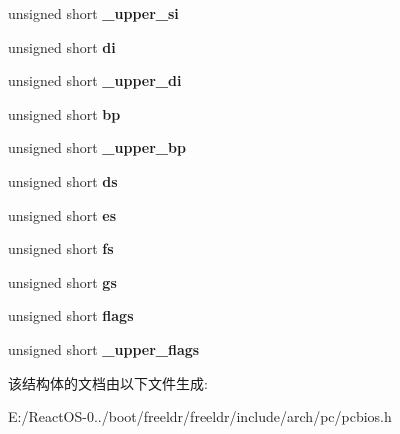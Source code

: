 \begin{DoxyCompactItemize}
\item 
\mbox{\label{struct_w_o_r_d_r_e_g_s_ae79dd0b6562261004e830e0d339dc45c}} 
unsigned short {\bfseries \+\_\+upper\+\_\+si}
\item 
\mbox{\label{struct_w_o_r_d_r_e_g_s_a737769131bbc71db008714a487a4e87e}} 
unsigned short {\bfseries di}
\item 
\mbox{\label{struct_w_o_r_d_r_e_g_s_a916060db92cf4dfe23b21ba8c48dd44b}} 
unsigned short {\bfseries \+\_\+upper\+\_\+di}
\item 
\mbox{\label{struct_w_o_r_d_r_e_g_s_a39f4bf7e8cc876d06f5a384995f76768}} 
unsigned short {\bfseries bp}
\item 
\mbox{\label{struct_w_o_r_d_r_e_g_s_a6f99f070b8236fb0e02030d358c5e6d6}} 
unsigned short {\bfseries \+\_\+upper\+\_\+bp}
\item 
\mbox{\label{struct_w_o_r_d_r_e_g_s_ac0cfdf461d69ec88d804268e5c4a64ec}} 
unsigned short {\bfseries ds}
\item 
\mbox{\label{struct_w_o_r_d_r_e_g_s_a56d6b81528242de8618fb77d7972046a}} 
unsigned short {\bfseries es}
\item 
\mbox{\label{struct_w_o_r_d_r_e_g_s_acb88191ac94fbc19c9613f605f32043c}} 
unsigned short {\bfseries fs}
\item 
\mbox{\label{struct_w_o_r_d_r_e_g_s_af207e5ad611cb5d2457f6d098dce243d}} 
unsigned short {\bfseries gs}
\item 
\mbox{\label{struct_w_o_r_d_r_e_g_s_a000a01a874837438e832d945900c84e8}} 
unsigned short {\bfseries flags}
\item 
\mbox{\label{struct_w_o_r_d_r_e_g_s_a376e1c9f58d5262268ccb503bd0ed9aa}} 
unsigned short {\bfseries \+\_\+upper\+\_\+flags}
\end{DoxyCompactItemize}


该结构体的文档由以下文件生成\+:\begin{DoxyCompactItemize}
\item 
E\+:/\+React\+O\+S-\/0../boot/freeldr/freeldr/include/arch/pc/pcbios.\+h\end{DoxyCompactItemize}
